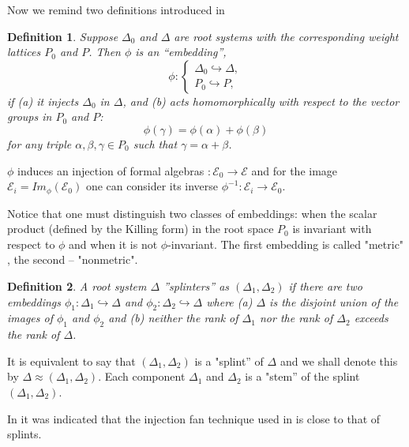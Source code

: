 \documentclass[12pt]{article}
\newtheorem{Def}{Definition}[section]
\begin{document}
Now we remind two definitions introduced in \cite{richter2008splints}

\begin{Def}
Suppose $\Delta _{0}$ and $\Delta $ are root systems with the corresponding
weight lattices $P_{0}$ and $P$. Then $\phi $ is an ``embedding'',
\begin{equation}
\phi :\left\{
\begin{array}{l}
\Delta _{0}\hookrightarrow \Delta , \\
P_{0}\hookrightarrow P,
\end{array}
\right.
\end{equation}
if \newline
\noindent (a) it injects $\Delta _{0}$ in $\Delta $, and \newline
\noindent (b) acts homomorphically with respect to the vector groups in $%
P_{0}$ and $P$:
\[
\phi (\gamma )=\phi (\alpha )+\phi (\beta )
\]
for any triple $\alpha ,\beta ,\gamma \in P_{0}$ such that $\gamma =\alpha
+\beta $.
\end{Def}

$\phi$ induces an injection of formal algebras $:{\mathcal{E}}_0
\longrightarrow \mathcal{E}$ and for the image ${\mathcal{E}}%
_i=Im_{\phi}\left( {\mathcal{E}}_0\right)$ one can consider its inverse $%
\phi^{-1}:{\mathcal{E}}_i \longrightarrow {\mathcal{E}}_0$.

Notice that one must distinguish two classes of embeddings: when the scalar
product (defined by the Killing form) in the root space $P_0$ is invariant
with respect to $\phi$ and when it is not $\phi$-invariant. The first
embedding is called "metric" , the second -- "nonmetric".

\begin{Def}
A root system $\Delta $ ''splinters'' as $(\Delta _{1},\Delta _{2})$ if
there are two embeddings $\phi _{1}:\Delta _{1}\hookrightarrow \Delta $ and $%
\phi _{2}:\Delta _{2}\hookrightarrow \Delta $ where (a) $\Delta $ is the
disjoint union of the images of $\phi _{1}$ and $\phi _{2}$ and (b) neither
the rank of $\Delta _{1}$ nor the rank of $\Delta _{2}$ exceeds the rank of $%
\Delta $.
\end{Def}

It is equivalent to say that $(\Delta_1,\Delta_2)$ is a "splint'' of $\Delta$
and we shall denote this by $\Delta \approx (\Delta_1,\Delta_2)$. Each
component $\Delta_1$ and $\Delta_2$ is a "stem'' of the splint $%
(\Delta_1,\Delta_2)$.

In \cite{richter2008splints} it was indicated that the injection fan technique used in
\cite{lyakhovsky1996rra} is close to that of splints.
\end{document}
